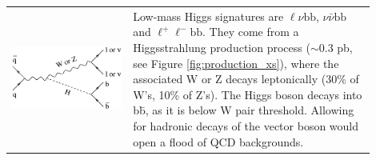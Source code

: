 \documentclass[12pt]{article}
\def\bbbar{b\={b}}
\begin{document}
\begin{tabular}{p{0.3\linewidth} p{0.6\linewidth}}
  \begin{minipage}{\linewidth} \centering \includegraphics[scale=0.4]{signature_LA.eps} \end{minipage} &

  \begin{minipage}{\linewidth}

    Low-mass Higgs signatures are $\ell \nu \mbox{b\={b}}$, $\nu
    \bar{\nu} \mbox{b\={b}}$ and $\ell^+ \ell^- \mbox{b\={b}}$. They
    come from a Higgsstrahlung production process ($\sim$0.3 pb, see
    Figure \ref{fig:production_xs}), where the associated W or Z
    decays leptonically (30\% of W's, 10\% of Z's). The Higgs boson
    decays into \bbbar, as it is below W pair threshold. Allowing for
    hadronic decays of the vector boson would open a flood of QCD
    backgrounds.

  \end{minipage}
\end{tabular}

\vspace{\parskip}
\end{document}
